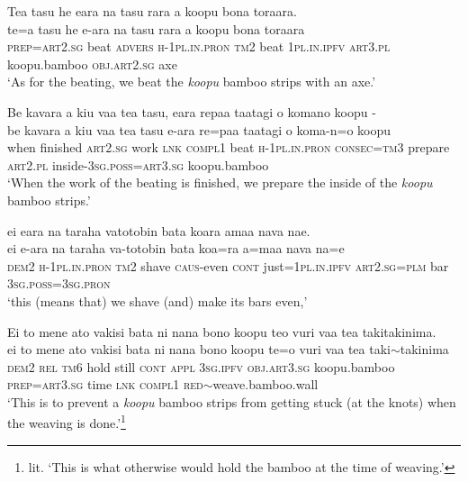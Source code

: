 \ea\label{ex:text14-21}
Tea tasu he eara na tasu rara a koopu bona toraara.\\
\gll te=a	tasu	he	e-ara	na	tasu	rara	a	koopu	bona	toraara\\
     \textsc{prep}=\textsc{art}2.\textsc{sg}	beat	\textsc{advers}	\textsc{h}-1\textsc{pl}.\textsc{in}.\textsc{pron}	\textsc{tm}2	beat	1\textsc{pl}.\textsc{in}.\textsc{ipfv}	\textsc{art}3.\textsc{pl}	koopu.bamboo	\textsc{obj}.\textsc{art}2.\textsc{sg}	axe\\
\glt `As for the beating, we beat the \textit{koopu} bamboo strips with an axe.'
\z

\ea\label{ex:text14-22}
Be kavara a kiu vaa tea tasu, eara repaa taatagi o komano koopu -\\
\gll be	kavara	a	kiu	vaa	tea	tasu	e-ara	re=paa	taatagi	o	koma-n=o	koopu\\
     when	finished	\textsc{art}2.\textsc{sg}	work	\textsc{lnk}	\textsc{compl}1	beat	\textsc{h}-1\textsc{pl}.\textsc{in}.\textsc{pron}	\textsc{consec}=\textsc{tm}3	prepare	\textsc{art}2.\textsc{pl}	inside-3\textsc{sg}.\textsc{poss}=\textsc{art}3.\textsc{sg}	koopu.bamboo\\
\glt `When the work of the beating is finished, we prepare the inside of the \textit{koopu} bamboo strips.'
\z

\newpage
\ea\label{ex:text14-23}
ei eara na taraha vatotobin bata koara amaa nava nae.\\
\gll ei	e-ara	na	taraha	va-totobin	bata	koa=ra	a=maa	nava	na=e\\
     \textsc{dem}2	\textsc{h}-1\textsc{pl}.\textsc{in}.\textsc{pron}	\textsc{tm}2	shave	\textsc{caus}-even	\textsc{cont}	just=1\textsc{pl}.\textsc{in}.\textsc{ipfv}	\textsc{art}2.\textsc{sg}=\textsc{plm}	bar	3\textsc{sg}.\textsc{poss}=3\textsc{sg}.\textsc{pron}\\
\glt `this (means that) we shave (and) make its bars even,'
\z

\ea\label{ex:text14-24}
Ei to mene ato vakisi bata ni nana bono koopu teo vuri vaa tea takitakinima.\\
\gll ei	to	mene	ato	vakisi	bata	ni	nana	bono	koopu	te=o	vuri	vaa	tea	taki{$\sim$}takinima\\
     \textsc{dem}2	\textsc{rel}	\textsc{tm}6	hold	still	\textsc{cont}	\textsc{appl}	3\textsc{sg}.\textsc{ipfv}	\textsc{obj}.\textsc{art}3.\textsc{sg}	koopu.bamboo	\textsc{prep}=\textsc{art}3.\textsc{sg}	time	\textsc{lnk}	\textsc{compl}1	\textsc{red}{$\sim$}weave.bamboo.wall\\
\glt `This is to prevent a \textit{koopu} bamboo strips from getting stuck (at the knots) when the weaving is done.'\footnote{lit. `This is what otherwise would hold the bamboo at the time of weaving.'}
\z

